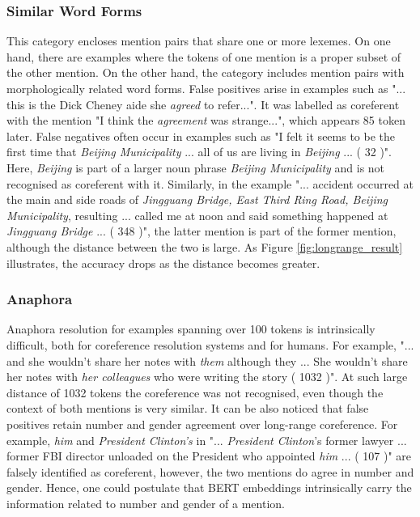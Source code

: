 \documentclass[11pt]{article}
\begin{document}
\subsubsection{Similar Word Forms} 
This category encloses mention pairs that share one or more lexemes. On one hand, there are examples where the tokens of one mention is a proper subset of the other mention. On the other hand, the category includes mention pairs with morphologically related word forms.
False positives arise in examples such as "... this is the Dick Cheney aide she \textit{agreed} to refer...". It was labelled as coreferent with the mention "I think the \textit{agreement} was strange...", which appears 85 token later. 
False negatives often occur in examples such as "I felt it seems to be the first time that \textit{Beijing Municipality} ... all of us are living in \textit{Beijing} ... ( 32 )". Here, \textit{Beijing} is part of a larger noun phrase \textit{Beijing Municipality} and is not recognised as coreferent with it. Similarly, in the example "... accident occurred at the main and side roads of \textit{Jingguang Bridge, East Third Ring Road, Beijing Municipality}, resulting ... called me at noon and said something happened at \textit{Jingguang Bridge} ... ( 348 )", the latter mention is part of the former mention, although the distance between the two is large. As Figure \ref{fig:longrange_result} illustrates, the accuracy drops as the distance becomes greater.

\subsubsection{Anaphora}

Anaphora resolution for examples spanning over 100 tokens is intrinsically difficult, both for coreference resolution systems and for humans. For example, "... and she wouldn't share her notes with \textit{them} although they ... She wouldn't share her notes with \textit{her colleagues} who were writing the story ( 1032 )". At such large distance of 1032 tokens the coreference was not recognised, even though the context of both mentions is very similar. It can be also noticed that false positives retain number and gender agreement over long-range coreference. For example, \textit{him} and \textit{President Clinton's} in "... \textit{President Clinton}'s former lawyer ... former FBI director unloaded on the President who appointed \textit{him} ... ( 107 )" are falsely identified as coreferent, however, the two mentions do agree in number and gender. Hence, one could postulate that BERT embeddings intrinsically carry the information related to number and gender of a mention. 
\end{document}

